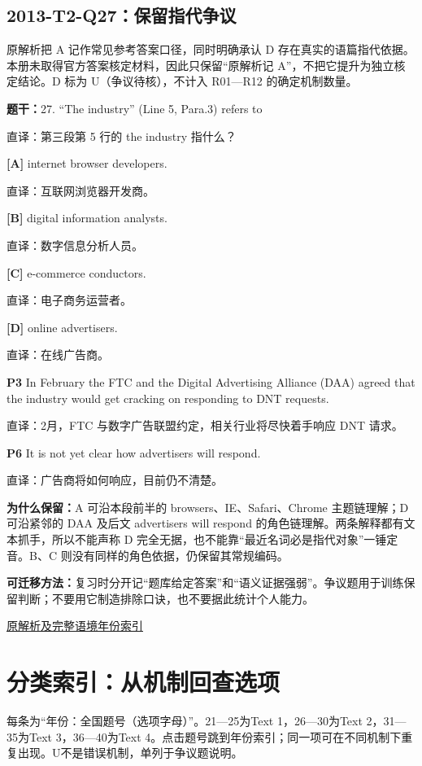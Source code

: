 \documentclass[11pt,a4paper]{article}
\begin{document}
\subsection{2013-T2-Q27：保留指代争议}\label{dispute}
原解析把 A 记作常见参考答案口径，同时明确承认 D 存在真实的语篇指代依据。本册未取得官方答案核定材料，因此只保留“原解析记 A”，不把它提升为独立核定结论。D 标为 U（争议待核），不计入 R01—R12 的确定机制数量。\par
\noindent\textbf{题干：}27. “The industry” (Line 5, Para.3) refers to\par
直译：第三段第 5 行的 the industry 指什么？\par
\noindent\textbf{[A]} internet browser developers.\par 直译：互联网浏览器开发商。\par
\noindent\textbf{[B]} digital information analysts.\par 直译：数字信息分析人员。\par
\noindent\textbf{[C]} e-commerce conductors.\par 直译：电子商务运营者。\par
\noindent\textbf{[D]} online advertisers.\par 直译：在线广告商。\par
\begin{evidence}
\textbf{P3} In February the FTC and the Digital Advertising Alliance (DAA) agreed that the industry would get cracking on responding to DNT requests.\par 直译：2月，FTC 与数字广告联盟约定，相关行业将尽快着手响应 DNT 请求。\par
\textbf{P6} It is not yet clear how advertisers will respond.\par 直译：广告商将如何响应，目前仍不清楚。\par
\end{evidence}
\noindent\textbf{为什么保留：}A 可沿本段前半的 browsers、IE、Safari、Chrome 主题链理解；D 可沿紧邻的 DAA 及后文 advertisers will respond 的角色链理解。两条解释都有文本抓手，所以不能声称 D 完全无据，也不能靠“最近名词必是指代对象”一锤定音。B、C 则没有同样的角色依据，仍保留其常规编码。\par
\noindent\textbf{可迁移方法：}复习时分开记“题库给定答案”和“语义证据强弱”。争议题用于训练保留判断；不要用它制造排除口诀，也不要据此统计个人能力。\par
\noindent \href{https://zj139.github.io/math-notes/english/24e1f1efe1e982cf789b6917/\#q27}{原解析及完整语境}\quad \hyperref[idx-2013-T2-Q27]{年份索引}
\clearpage\section{分类索引：从机制回查选项}\label{class-index}
每条为“年份：全国题号（选项字母）”。21—25为Text 1，26—30为Text 2，31—35为Text 3，36—40为Text 4。点击题号跳到年份索引；同一项可在不同机制下重复出现。U不是错误机制，单列于争议题说明。\par
{}
\end{document}
